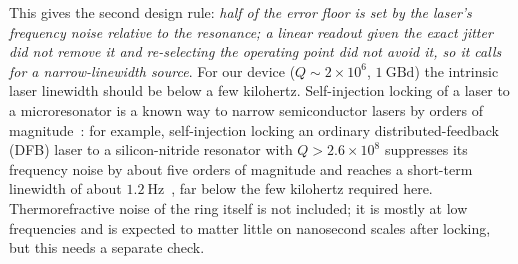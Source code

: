 This gives the second design rule: \emph{half of the error floor is set by the laser's frequency noise relative to the resonance; a
linear readout given the exact jitter did not remove it and re-selecting the operating point did not avoid it, so it calls for a
narrow-linewidth source}.
For our device ($Q\sim2\times10^{6}$, $1~\mathrm{GBd}$) the intrinsic laser linewidth should be below a few kilohertz.
Self-injection locking of a laser to a microresonator is a known way to narrow semiconductor lasers by orders of
magnitude~\cite{shen2020,jin2021}: for example, self-injection locking an ordinary distributed-feedback (DFB) laser to a silicon-nitride resonator with
$Q>2.6\times10^{8}$ suppresses its frequency noise by about five orders of magnitude and reaches a short-term linewidth of about
$1.2~\mathrm{Hz}$~\cite{jin2021}, far below the few kilohertz required here.
Thermorefractive noise of the ring itself is not included; it is mostly at low frequencies and is expected to matter little on
nanosecond scales after locking, but this needs a separate check.

